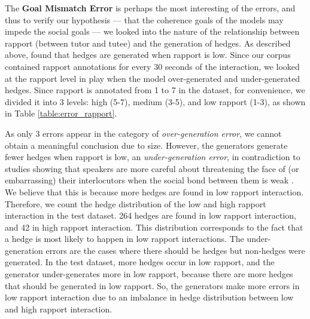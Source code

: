 \documentclass[11pt]{article}
\begin{document}
The \textbf{Goal Mismatch Error} is perhaps the most interesting of the errors, and thus to verify our hypothesis --- that the coherence goals of the models may impede the social goals --- we looked into the nature of the relationship between rapport (between tutor and tutee) and the generation of hedges. As described above, \citet{madaio2017impact} found that hedges are generated when rapport is low. Since our corpus contained rapport annotations for every 30 seconds of the interaction, we looked at the rapport level in play when the model over-generated and under-generated hedges. Since rapport is annotated from 1 to 7 in the dataset, for convenience, we divided it into 3 levels: high (5-7), medium (3-5), and low rapport (1-3), as shown in Table \ref{table:error_rapport}.

\begin{table}[!ht]
    \centering
    \caption{\footnotesize{Goal Mismatch Errors Distribution}}
    \label{table:error_rapport}
\end{table}

As only 3 errors appear in the category of \textit{over-generation error}, we cannot obtain a meaningful conclusion due to size. However, the generators generate fewer hedges when rapport is low, an \textit{under-generation error}, in contradiction to studies showing that speakers are more careful about threatening the face of (or embarrassing) their interlocutors when the social bond between them is weak \citep{madaio2017impact}. We believe that this is because more hedges are found in low rapport interaction. Therefore, we count the hedge distribution of the low and high rapport interaction in the test dataset. 264 hedges are found in low rapport interaction, and 42 in high rapport interaction. This distribution corresponds to the fact that a hedge is most likely to happen in low rapport interactions. The under-generation errors are the cases where there should be hedges but non-hedges were generated. In the test dataset, more hedges occur in low rapport, and the generator under-generates more in low rapport, because there are more hedges that should be generated in low rapport. So, the generators make more errors in low rapport interaction due to an imbalance in hedge distribution between low and high rapport interaction.
\end{document}
